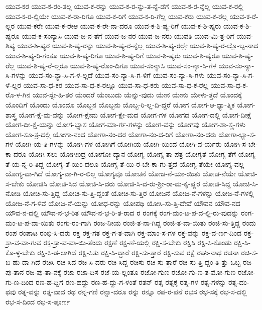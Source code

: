 {ಯುವ-ಕರ
ಯುವ-ಕ-ರಂ-ತಲ್ಲ
ಯುವ-ಕ-ರನ್ನು
ಯುವ-ಕ-ರ-ನ್ನು-ತ-ನ್ನೆ-ಡೆಗೆ
ಯುವ-ಕ-ರ-ನ್ನೆಲ್ಲ
ಯುವ-ಕ-ರಲ್ಲಿ
ಯುವ-ಕ-ರ-ಲ್ಲಿಯೇ
ಯುವ-ಕ-ರಾ-ರಿಗೂ
ಯುವ-ಕ-ರಿಗೆ
ಯುವ-ಕ-ರಿ-ಗೆಲ್ಲ
ಯುವ-ಕರು
ಯುವ-ಕ-ರೆಲ್ಲ
ಯುವ-ಕ-ರೆ-ಲ್ಲರ
ಯುವ-ಕರೇ
ಯುವ-ಕ-ರೇಆ
ಯುವ-ಕ-ರೇ-ನಾ-ದರೂ
ಯುವ-ಕ-ಶಿ-ಷ್ಯ-ರಿಗೆ
ಯುವ-ಕ-ಶಿ-ಷ್ಯರು
ಯುವ-ಕ-ಶಿ-ಷ್ಯರೂ
ಯುವ-ಕ-ಸಂನ್ಯಾಸಿ
ಯುವ-ಜ-ನ-ತೆಗೆ
ಯುವ-ಜ-ನರ
ಯುವ-ಜ-ನರು
ಯುವತಿ
ಯುವ-ಮಿ-ತ್ರ-ರಿಗೆ
ಯುವ-ಶಿಷ್ಯ
ಯುವ-ಶಿ-ಷ್ಯರ
ಯುವ-ಶಿ-ಷ್ಯ-ರನ್ನು
ಯುವ-ಶಿ-ಷ್ಯ-ರ-ನ್ನೆಲ್ಲ
ಯುವ-ಶಿ-ಷ್ಯ-ರಲ್ಲೇ
ಯುವ-ಶಿ-ಷ್ಯ-ರ-ಲ್ಲೊ-ಬ್ಬ-ನಾದ
ಯುವ-ಶಿ-ಷ್ಯ-ರಿ-ಗಂತೂ
ಯುವ-ಶಿ-ಷ್ಯ-ರಿಗೂ
ಯುವ-ಶಿ-ಷ್ಯ-ರಿಗೆ
ಯುವ-ಶಿ-ಷ್ಯರು
ಯುವ-ಶಿ-ಷ್ಯರೂ
ಯುವ-ಶಿ-ಷ್ಯ-ರೆಲ್ಲ
ಯುವ-ಶಿ-ಷ್ಯ-ರೆ-ಲ್ಲರೂ
ಯುವ-ಶಿ-ಷ್ಯ-ರೊಂ-ದಿಗೂ
ಯುವ-ಸಂನ್ಯಾಸಿ
ಯುವ-ಸಂ-ನ್ಯಾ-ಸಿ-ಗಳ
ಯುವ-ಸಂ-ನ್ಯಾ-ಸಿ-ಗಳನ್ನು
ಯುವ-ಸಂ-ನ್ಯಾ-ಸಿ-ಗ-ಳ-ಲ್ಲದೆ
ಯುವ-ಸಂ-ನ್ಯಾ-ಸಿ-ಗ-ಳಿಗೆ
ಯುವ-ಸಂ-ನ್ಯಾ-ಸಿ-ಗಳು
ಯುವ-ಸಂ-ನ್ಯಾ-ಸಿ-ಗ-ಳೆ-ಲ್ಲರ
ಯುವ-ಸಾ-ಧ-ಕರ
ಯುವ-ಸಾ-ಧ-ಕ-ರಲ್ಲೂ
ಯುವ-ಸಾ-ಧ-ಕರು
ಯುವ-ಸಾ-ಧ-ಕ-ರೆಲ್ಲ
ಯುವ-ಸಾ-ಧ-ಕ-ರೊ-ಳ-ಗಿನ
ಯುವ-ಸ್ನೇ-ಹಿ-ತರ
ಯೆಂದರೆ
ಯೆಂಬುದು
ಯೆನ್ನು-ವುದು
ಯೇನ
ಯೇನು
ಯೇಳು-ತ್ತದೆ
ಯೊಂದಕ್ಕೆ
ಯೊಂದಿಗೆ
ಯೊಂದು
ಯೊಂದೂ
ಯೊಬ್ಬನ
ಯೊಬ್ಬನು
ಯೊಬ್ಬ-ರಿ-ಲ್ಲ-ದಿ-ದ್ದರೆ
ಯೋಗ
ಯೋಗ-ಆ-ಧ್ಯಾ-ತ್ಮಿಕ
ಯೋಗ-ಶಾಸ್ತ್ರ
ಯೋಗ-ಕ್ಷೆ-ಮ-ವನ್ನು
ಯೋಗ-ಕ್ಷೇಮ
ಯೋಗ-ಕ್ಷೇ-ಮದ
ಯೋಗ-ಗಳ
ಯೋಗದ
ಯೋಗ-ದಲ್ಲಿ
ಯೋಗ-ದೀಕ್ಷೆ
ಯೋಗ-ದೀ-ಕ್ಷೆ-ಯನ್ನು
ಯೋಗ-ಭ್ಯಾಸ
ಯೋಗ-ಮಾ-ರ್ಗ-ಗಳನ್ನು
ಯೋಗ-ವನ್ನು
ಯೋಗವು
ಯೋಗ-ಶಾ-ಸ್ತ್ರ-ಗಳು
ಯೋಗ-ಸೂ-ತ್ರ-ದಲ್ಲಿ
ಯೋಗಾ-ನಂದ
ಯೋಗಾ-ನಂ-ದರ
ಯೋಗಾ-ನಂ-ದ-ರಿಗೆ
ಯೋಗಾ-ನಂ-ದರು
ಯೋಗಾ-ಭ್ಯಾ-ಸ-ಗಳ
ಯೋಗಿ-ಯ-ತಿ-ಗಳನ್ನು
ಯೋಗಿ-ಗಳ
ಯೋಗಿಗೆ
ಯೋಗಿಯ
ಯೋಗಿ-ಯಿಂದ
ಯೋಗಿ-ವ-ರ್ಯರು
ಯೋಗಿ-ಸ-ಬೇ-ಕಾ-ದರೂ
ಯೋಗಿ-ಸಲು
ಯೋಗೀಂದ್ರ
ಯೋಗೋ-ದ್ಯಾನ
ಯೋಗ್ಯ
ಯೋಗ್ಯ-ತಾ-ಪತ್ರ
ಯೋಗ್ಯತೆ
ಯೋಗ್ಯ-ತೆಗೆ
ಯೋಗ್ಯ-ತೆ-ಯ-ನ್ನ-ರಿ-ತಿದ್ದ
ಯೋಗ್ಯ-ತೆ-ಯಿಂ-ದಲೂ
ಯೋಗ್ಯ-ತೆ-ಯಿ-ರ-ಬೇ-ಕಾ-ಗು-ತ್ತದೆ
ಯೋಗ್ಯ-ತೆಯೇ
ಯೋಗ್ಯ-ವಲ್ಲ
ಯೋಗ್ಯ-ವಾ-ಗಿದೆ
ಯೋಗ್ಯ-ವಾ-ಗಿ-ರ-ಲಿಲ್ಲ
ಯೋಗ್ಯವೂ
ಯೋಚನೆ
ಯೋಚ-ನೆ-ಯಾ-ಯಿತು
ಯೋಚ-ನೆಯೇ
ಯೋಚಿ-ಸ-ಬೇಕು
ಯೋಚಿಸಿ
ಯೋಚಿ-ಸಿದ
ಯೋಚಿ-ಸಿ-ದರು
ಯೋಚಿ-ಸಿ-ದ-ರು-ಶ್ರೀ-ರಾ-ಮ-ಕೃ-ಷ್ಣರ
ಯೋಚಿ-ಸಿದ್ದ
ಯೋಚಿ-ಸಿ-ನೋಡಿ
ಯೋಚಿ-ಸು-ತ್ತಿದ್ದ
ಯೋಚಿ-ಸು-ತ್ತಿ-ದ್ದಂತೆ
ಯೋಚಿ-ಸು-ತ್ತಿರ
ಯೋಜನೆ
ಯೋಜ-ನೆ-ಗಳನ್ನು
ಯೋಜ-ನೆ-ಗಳಲ್ಲಿ
ಯೋಜ-ನೆ-ಗ-ಳಿವೆ
ಯೋಜ-ನೆ-ಯನ್ನು
ಯೋಧ-ರನ್ನು
ಯೋಪಥಿ
ಯೋಸಿ-ಸು-ತ್ತಿ-ದೇವೆ
ಯೌವನ
ಯೌವ-ನದ
ಯೌವ-ನ-ದಲ್ಲಿ
ಯೌವ-ನ-ಭ-ರಿತ
ಯೌವ-ನ-ಭ-ರಿ-ತ-ರಾದ
ರ
ರಂಗಕ್ಕೆ
ರಂಗ-ಮಂ-ಟ-ಪ-ದ-ಲ್ಲಿ-ರು-ವುದನ್ನು
ರಂಗ-ಮಂ-ಟ-ಪ-ವಾ-ಯಿತು
ರಂಗು-ರಂ-ಗಾಗಿ
ರಂಜ-ನೀಯ
ರಂಜಿ-ತ-ನಾ-ಗಿದ್ದ
ರಂಜಿ-ತ-ವಾ-ಯಿತು
ರಂಜಿ-ಸು-ತ್ತಿದ್ದ
ರಂದು
ರಂಪ
ರಂಪಾಟ
ರಂಭಿ-ಸಿ-ದರು
ರಕ್ತ
ರಕ್ತ-ಗತ
ರಕ್ತ-ಗ-ತ-ವಾಗಿ
ರಕ್ತ-ಮಾಂ-ಸ-ಗಳ
ರಕ್ತ-ವನ್ನು
ರಕ್ತ-ವ-ರ್ಣ-ದಿಂದ
ರಕ್ತ-ಸ್ರಾ-ವ-ವಾ-ಗುವ
ರಕ್ತ-ಸ್ರಾ-ವ-ವಾ-ಯಿ-ತೆಂದು
ರಕ್ಷಣೆ
ರಕ್ಷ-ಣೆ-ಯಲ್ಲಿ
ರಕ್ಷಿ-ಸ-ಬೇಕು
ರಕ್ಷಿಸಿ
ರಕ್ಷಿ-ಸಿ-ಕೊಂಡು
ರಕ್ಷಿ-ಸಿ-ಕೊ-ಳ್ಳ-ಬೇಕು
ರಕ್ಷಿ-ಸಿ-ಡ-ಲಾಗಿದೆ
ರಕ್ಷಿ-ಸಿತು
ರಕ್ಷಿ-ಸಿ-ದ್ದಾರೆ
ರಕ್ಷಿ-ಸು-ತ್ತಾರೆ
ರಕ್ಷಿ-ಸುವ
ರಕ್ಷೆ
ರಘು-ನಾಥ
ರಚನಾ
ರಚಿ-ಸ-ಬ-ಹು-ದಾ-ಗಿದೆ
ರಚಿಸಿ
ರಚಿ-ಸಿದ
ರಚಿ-ಸಿ-ದರು
ರಚಿ-ಸಿದ್ದ
ರಚಿಸು
ರಚಿ-ಸು-ತ್ತಾರೆ
ರಚಿ-ಸು-ತ್ತಿ-ದ್ದಂ-ತಿ-ತ್ತು-ಒಬ್ಬ
ರಜ-ಪು-ತಾನ
ರಜ-ಪು-ತಾ-ನಕ್ಕೆ
ರಜಾ
ರಜಾ-ದಿಸ
ರಜೆ-ಯ-ಲ್ಲಂತೂ
ರಜೋ-ಗುಣ
ರಜೋ-ಗು-ಣ-ತ-ಮೋ-ಗುಣ
ರಜೋ-ಗು-ಣ-ದಿಂದ
ರಣ-ಹ-ದ್ದಿಗೆ
ರಣ-ಹದ್ದು
ರಣ-ಹ-ದ್ದು-ಗ-ಳಂತೆ
ರತನ್
ರತ್ನ
ರತ್ನಕ್ಕೆ
ರತ್ನ-ಗಳ
ರತ್ನ-ಗಳನ್ನು
ರತ್ನ-ದಂ-ಥವು
ರತ್ನ-ವನ್ನು
ರತ್ನ-ವಾದ
ರಥ
ರನ್ನ-ಗಣಿ
ರನ್ನಾ-ದರೂ
ರನ್ನು
ರನ್ನೂ
ರಪ-ರ-ಪನೆ
ರಭಸ
ರಭ-ಸಕ್ಕೆ
ರಭ-ಸ-ದಲ್ಲಿ
ರಭ-ಸ-ದಿಂದ
ರಭ-ಸ-ಪೂರ್ಣ
}

